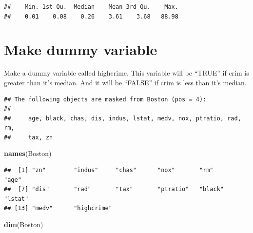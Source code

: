 \documentclass[
]{article}
\newenvironment{Shaded}{\begin{snugshade}}{\end{snugshade}}
\newcommand{\CommentTok}[1]{\textcolor[rgb]{0.56,0.35,0.01}{\textit{#1}}}
\newcommand{\DecValTok}[1]{\textcolor[rgb]{0.00,0.00,0.81}{#1}}
\newcommand{\KeywordTok}[1]{\textcolor[rgb]{0.13,0.29,0.53}{\textbf{#1}}}
\newcommand{\NormalTok}[1]{#1}
\newcommand{\OperatorTok}[1]{\textcolor[rgb]{0.81,0.36,0.00}{\textbf{#1}}}
\newcommand{\StringTok}[1]{\textcolor[rgb]{0.31,0.60,0.02}{#1}}
\begin{document}
\begin{verbatim}
##    Min. 1st Qu.  Median    Mean 3rd Qu.    Max. 
##    0.01    0.08    0.26    3.61    3.68   88.98
\end{verbatim}

\hypertarget{make-dummy-variable}{%
\section{Make dummy variable}\label{make-dummy-variable}}

Make a dummy variable called highcrime. This variable will be ``TRUE''
if crim is greater than it's median. And it will be ``FALSE'' if crim is
less than it's median.

\begin{Shaded}
\end{Shaded}

\begin{verbatim}
## The following objects are masked from Boston (pos = 4):
## 
##     age, black, chas, dis, indus, lstat, medv, nox, ptratio, rad, rm,
##     tax, zn
\end{verbatim}

\begin{Shaded}
\begin{Highlighting}[]
\KeywordTok{names}\NormalTok{(Boston)}
\end{Highlighting}
\end{Shaded}

\begin{verbatim}
##  [1] "zn"        "indus"     "chas"      "nox"       "rm"        "age"      
##  [7] "dis"       "rad"       "tax"       "ptratio"   "black"     "lstat"    
## [13] "medv"      "highcrime"
\end{verbatim}

\begin{Shaded}
\begin{Highlighting}[]
\KeywordTok{dim}\NormalTok{(Boston)}
\end{Highlighting}
\end{Shaded}
\end{document}
